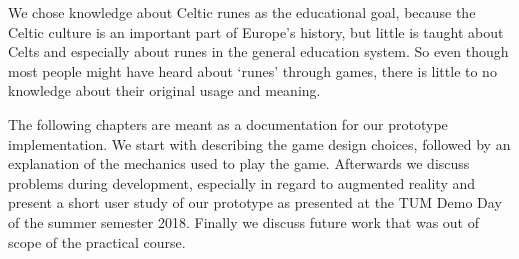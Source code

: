 We chose knowledge about Celtic runes as the educational goal, because the Celtic culture is an important part of Europe's history, but little is taught about Celts and especially about runes in the general education system. So even though most people might have heard about `runes' through games, there is little to no knowledge about their original usage and meaning.


The following chapters are meant as a documentation for our prototype implementation. We start with describing the game design choices, followed by an explanation of the mechanics used to play the game. Afterwards we discuss problems during development, especially in regard to augmented reality and present a short user study of our prototype as presented at the TUM Demo Day of the summer semester 2018. Finally we discuss future work that was out of scope of the practical course.







